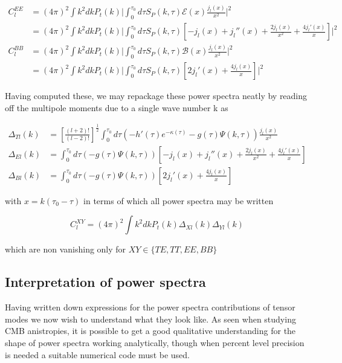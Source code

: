 \documentclass[a4paper,10pt]{article}
\newcommand{\half}{\frac{1}{2}}
\newcommand{\ltwo}{[\frac{(l+2)!}{(l-2)!}]}
\begin{document}
\begin{equation}\begin{split}
C_l^{EE} &= (4\pi)^2 \int k^2 dk P_t(k) \bigg|  \int_0^{\tau_0}d\tau  S_P(k,\tau)\mathcal{E}(x)\frac{j_l(x)}{x^2} \bigg|^2\\
&= (4\pi)^2\int k^2 dk P_t(k) \bigg|  \int_0^{\tau_0}d\tau  S_P(k,\tau)[-j_l(x) +j_l''(x)+\frac{2j_l(x)}{x^2} + \frac{4j_l'(x)}{x}]\bigg|^2\\
C_l^{BB} &= (4\pi)^2 \int k^2 dk P_t(k) \bigg|  \int_0^{\tau_0}d\tau  S_P(k,\tau)\mathcal{B}(x)\frac{j_l(x)}{x^2} \bigg|^2\\
&= (4\pi)^2\int k^2 dk P_t(k) \bigg|  \int_0^{\tau_0} d\tau S_P(k,\tau)[2j_l'(x)+\frac{4j_l(x)}{x}]\bigg|^2
\label{primordialBmodes}
\end{split}\end{equation}

Having computed these, we may repackage these power spectra neatly by reading off the multipole moments due to a single wave number k as 

\begin{equation}
\begin{split}
\Delta_{Tl}(k) &= \ltwo^\half \int_0^{\tau_0} d\tau (-h'(\tau)e^{-\kappa(\tau)}-g(\tau)\Psi(k,\tau))\frac{j_l(x)}{x^2}\\
\Delta_{El}(k) &= \int_0^{\tau_0}d\tau  (-g(\tau)\Psi(k,\tau))[-j_l(x) +j_l''(x)+\frac{2j_l(x)}{x^2} + \frac{4j_l'(x)}{x}]\\
\Delta_{Bl}(k) &= \int_0^{\tau_0} d\tau (-g(\tau)\Psi(k,\tau))[2j_l'(x)+\frac{4j_l(x)}{x}]
\end{split}
\end{equation}
 
with $x=k(\tau_0-\tau)$ in terms of which all power spectra may be written

\begin{equation}
C_l^{XY} = (4\pi)^2 \int k^2 dk P_t(k) \Delta_{Xl}(k)\Delta_{Yl}(k)
\end{equation}

which are non vanishing only for $XY \in \{TE, TT, EE, BB\}$

\subsection{Interpretation of power spectra}

Having written down expressions for the power spectra contributions of tensor modes we now wish to understand what they look like. As seen when studying CMB anistropies, it is possible to get a good qualitative understanding for the shape of power spectra working analytically, though when percent level precision is needed a suitable numerical code must be used.\\
\end{document}

